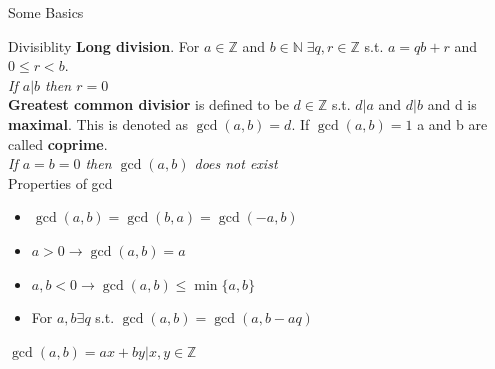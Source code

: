 \documentclass[12pt, letterpaper]{article}
\begin{document}
\begin{section}{Some Basics}
\begin{subsection}{Divisiblity}
    \textbf{Long division}. For \(a \in \mathbb{Z}\) and \(b \in \mathbb{N} \; \exists q, r \in \mathbb{Z}\)
    s.t. \(a = qb + r\) and \(0 \leq r < b\). \\
    \emph{If \(a | b\) then \(r = 0\)} \\

    \textbf{Greatest common divisior} is defined to be \(d \in \mathbb{Z}\) s.t.
    \(d | a\) and \(d | b\) and d is \textbf{maximal}. This is denoted as \(\gcd(a, b) = d\).
    If \(\gcd(a, b) = 1\) a and b are called \textbf{coprime}. \\
    \emph{If \(a = b = 0\) then \(\gcd(a, b)\) does not exist} \\
    Properties of gcd
    \begin{itemize}
      \item \(\gcd(a, b) = \gcd(b, a) = \gcd(-a, b)\)
      \item \(a > 0 \to \gcd(a, b) = a\)
      \item \(a, b < 0 \to \gcd(a, b) \leq \min\{ a, b \}\)
      \item For \(a, b \exists q\) s.t. \(\gcd(a, b) = \gcd(a, b - aq)\)
    \end{itemize}

    \emph{\(\gcd(a, b) = ax + by | x, y \in \mathbb{Z}\)}

  \end{subsection}

\end{section}
\end{document}
